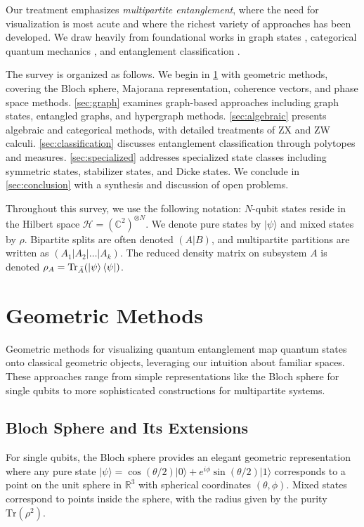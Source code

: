 \documentclass[%
 amsmath,amssymb,
 aps,
rmp,
]{revtex4-2}
\begin{document}
Our treatment emphasizes \emph{multipartite entanglement}, where the need for visualization is most acute and where the richest variety of approaches has been developed. We draw heavily from foundational works in graph states \cite{hein2004entanglement,hein2006multiparty}, categorical quantum mechanics \cite{cqm}, and entanglement classification \cite{EntangledGraphs}.

The survey is organized as follows. We begin in \cref{sec:geometric} with geometric methods, covering the Bloch sphere, Majorana representation, coherence vectors, and phase space methods. \cref{sec:graph} examines graph-based approaches including graph states, entangled graphs, and hypergraph methods. \cref{sec:algebraic} presents algebraic and categorical methods, with detailed treatments of ZX and ZW calculi. \cref{sec:classification} discusses entanglement classification through polytopes and measures. \cref{sec:specialized} addresses specialized state classes including symmetric states, stabilizer states, and Dicke states. We conclude in \cref{sec:conclusion} with a synthesis and discussion of open problems.

Throughout this survey, we use the following notation: $N$-qubit states reside in the Hilbert space $\mathcal{H} = (\mathbb{C}^2)^{\otimes N}$. We denote pure states by $|\psi\rangle$ and mixed states by $\rho$. Bipartite splits are often denoted $(A|B)$, and multipartite partitions are written as $(A_1|A_2|\ldots|A_k)$. The reduced density matrix on subsystem $A$ is denoted $\rho_A = \text{Tr}_{\bar{A}}(\ket{\psi}\bra{\psi})$.

\section{Geometric Methods}
\label{sec:geometric}

Geometric methods for visualizing quantum entanglement map quantum states onto classical geometric objects, leveraging our intuition about familiar spaces. These approaches range from simple representations like the Bloch sphere for single qubits to more sophisticated constructions for multipartite systems.

\subsection{Bloch Sphere and Its Extensions}
\label{sec:bloch}

For single qubits, the Bloch sphere provides an elegant geometric representation where any pure state $|\psi\rangle = \cos(\theta/2)|0\rangle + e^{i\phi}\sin(\theta/2)|1\rangle$ corresponds to a point on the unit sphere in $\mathbb{R}^3$ with spherical coordinates $(\theta, \phi)$. Mixed states correspond to points inside the sphere, with the radius given by the purity $\text{Tr}(\rho^2)$.
\end{document}
